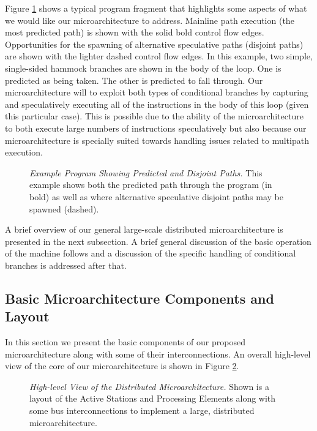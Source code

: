\documentclass[10pt,dvips]{article}
\begin{document}
Figure \ref{fig:disjoint} shows a typical program fragment that
highlights some aspects of what we would like our microarchitecture
to address.
Mainline path execution (the most predicted path) is shown with the
solid bold control flow edges.  Opportunities for the spawning of alternative
speculative paths (disjoint paths) are shown with the lighter dashed
control flow edges.  In this example, two simple, single-sided hammock 
branches are shown in the body of the loop.  One is predicted as
being taken.  The other is predicted to fall through.  Our microarchitecture
will to exploit both types of conditional branches by capturing
and speculatively executing
all of the instructions in the body of this loop (given this particular
case).  This is possible due to the ability of the microarchitecture to
both execute large numbers of instructions speculatively but also
because our microarchitecture is specially suited towards handling
issues related to multipath execution.

\begin{figure}
\centering
{}
\caption{{\em Example Program Showing Predicted and Disjoint
Paths.} 
This example shows both the predicted path through the program 
(in bold) as
well as where alternative speculative disjoint paths may be
spawned (dashed).}
\label{fig:disjoint}
\end{figure}

A brief overview of our general
large-scale distributed microarchitecture is presented in the next
subsection.  A brief general discussion of the basic operation
of the machine follows and a discussion of the specific handling
of conditional branches is addressed after that.
%
\subsection{Basic Microarchitecture Components and Layout}
%
In this section we present the basic components of our proposed
microarchitecture along with some of their interconnections.
An overall high-level view of the core of our microarchitecture is shown in 
Figure \ref{fig:window}.

\begin{figure}
\centering
{}
\caption{{\em High-level View of the Distributed Microarchitecture.} 
Shown is a layout of the Active Stations and Processing Elements
along with some bus interconnections to implement a large,
distributed microarchitecture.}
\label{fig:window}
\end{figure}
\end{document}
